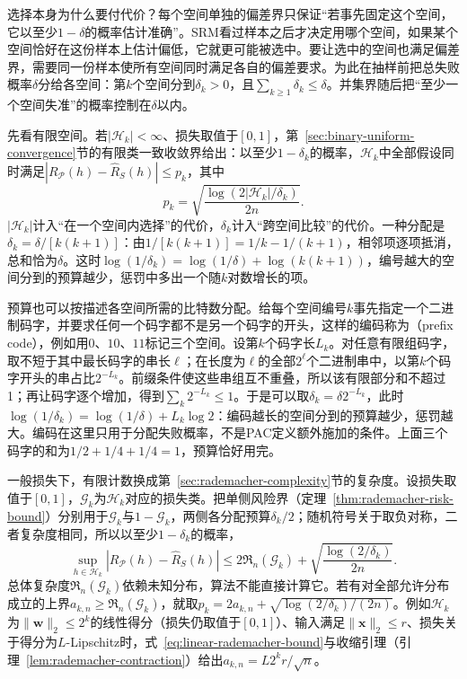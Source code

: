 选择本身为什么要付代价？每个空间单独的偏差界只保证“若事先固定这个空间，它以至少$1-\delta$的概率估计准确”。SRM看过样本之后才决定用哪个空间，如果某个空间恰好在这份样本上估计偏低，它就更可能被选中。要让选中的空间也满足偏差界，需要同一份样本使所有空间同时满足各自的偏差要求。为此在抽样前把总失败概率$\delta$分给各空间：第$k$个空间分到$\delta_k>0$，且$\sum_{k\geq1}\delta_k\leq\delta$。并集界随后把“至少一个空间失准”的概率控制在$\delta$以内。

先看有限空间。若$|\mathcal H_k|<\infty$、损失取值于$[0,1]$，第~\ref{sec:binary-uniform-convergence}节的有限类一致收敛界给出：以至少$1-\delta_k$的概率，$\mathcal H_k$中全部假设同时满足$|R_{\mathcal P}(h)-\hat R_S(h)|\leq p_k$，其中
\begin{equation}
 p_k=\sqrt{\frac{\log(2|\mathcal H_k|/\delta_k)}{2n}}.
 \label{eq:srm-finite-penalty}
\end{equation}
$|\mathcal H_k|$计入“在一个空间内选择”的代价，$\delta_k$计入“跨空间比较”的代价。一种分配是$\delta_k=\delta/[k(k+1)]$：由$1/[k(k+1)]=1/k-1/(k+1)$，相邻项逐项抵消，总和恰为$\delta$。这时$\log(1/\delta_k)=\log(1/\delta)+\log(k(k+1))$，编号越大的空间分到的预算越少，惩罚中多出一个随$k$对数增长的项。

预算也可以按描述各空间所需的比特数分配。给每个空间编号$k$事先指定一个二进制码字，并要求任何一个码字都不是另一个码字的开头，这样的编码称为（prefix code），例如用$0$、$10$、$11$标记三个空间。设第$k$个码字长$L_k$。对任意有限组码字，取不短于其中最长码字的串长$\ell$；在长度为$\ell$的全部$2^\ell$个二进制串中，以第$k$个码字开头的串占比$2^{-L_k}$。前缀条件使这些串组互不重叠，所以该有限部分和不超过1；再让码字逐个增加，得到$\sum_k2^{-L_k}\leq1$。于是可以取$\delta_k=\delta2^{-L_k}$，此时$\log(1/\delta_k)=\log(1/\delta)+L_k\log2$：编码越长的空间分到的预算越少，惩罚越大。编码在这里只用于分配失败概率，不是PAC定义额外施加的条件。上面三个码字的和为$1/2+1/4+1/4=1$，预算恰好用完。

一般损失下，有限计数换成第~\ref{sec:rademacher-complexity}节的复杂度。设损失取值于$[0,1]$，$\mathcal G_k$为$\mathcal H_k$对应的损失类。把单侧风险界（定理~\ref{thm:rademacher-risk-bound}）分别用于$\mathcal G_k$与$1-\mathcal G_k$，两侧各分配预算$\delta_k/2$；随机符号关于取负对称，二者复杂度相同，所以以至少$1-\delta_k$的概率，
\[
 \sup_{h\in\mathcal H_k}|R_{\mathcal P}(h)-\hat R_S(h)|
 \leq2\mathfrak R_n(\mathcal G_k)+\sqrt{\frac{\log(2/\delta_k)}{2n}}.
\]
总体复杂度$\mathfrak R_n(\mathcal G_k)$依赖未知分布，算法不能直接计算它。若有对全部允许分布成立的上界$a_{k,n}\geq\mathfrak R_n(\mathcal G_k)$，就取$p_k=2a_{k,n}+\sqrt{\log(2/\delta_k)/(2n)}$。例如$\mathcal H_k$为$\|\bm w\|_2\leq2^k$的线性得分（损失仍取值于$[0,1]$）、输入满足$\|\bm x\|_2\leq r$、损失关于得分为$L$-Lipschitz时，式~\eqref{eq:linear-rademacher-bound}与收缩引理（引理~\ref{lem:rademacher-contraction}）给出$a_{k,n}=L2^kr/\sqrt n$。

